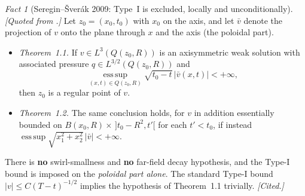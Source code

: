 \documentclass[11pt]{article}
\theoremstyle{definition}
\theoremstyle{remark}
\newtheorem{fact}[theorem]{Fact}
\begin{document}
\begin{fact}[Seregin--\v{S}ver\'ak 2009: Type~I is excluded, locally and
  unconditionally]\label{fact:s51-ss}
  \emph{[Quoted from \cite[Thms.~1.1--1.2]{SereginSverak2009}.]} Let
  $z_0=(x_0,t_0)$ with $x_0$ on the axis, and let $\bar v$ denote the
  projection of $v$ onto the plane through $x$ and the axis (the poloidal
  part).
  \begin{itemize}[leftmargin=1.6em]
  \item \emph{Theorem~1.1.} If $v\in L^3(Q(z_0,R))$ is an axisymmetric weak
    solution with associated pressure $q\in L^{3/2}(Q(z_0,R))$ and
    \[
      \operatorname*{ess\,sup}_{(x,t)\in Q(z_0,R)}\sqrt{t_0-t}\,|\bar v(x,t)|
        <+\infty ,
    \]
    then $z_0$ is a regular point of $v$.
  \item \emph{Theorem~1.2.} The same conclusion holds, for $v$ in addition
    essentially bounded on $B(x_0,R)\times\,]t_0-R^2,t'[$ for each $t'<t_0$,
    if instead $\operatorname*{ess\,sup}\sqrt{x_1^2+x_2^2}\,|\bar v|<+\infty$.
  \end{itemize}
  There is \textbf{no} swirl-smallness and \textbf{no} far-field decay
  hypothesis, and the Type-I bound is imposed on the \emph{poloidal part
  alone}. The standard Type-I bound $|v|\leq C(T-t)^{-1/2}$ implies the
  hypothesis of Theorem~1.1 trivially. \emph{[Cited.]}
\end{fact}
\end{document}
